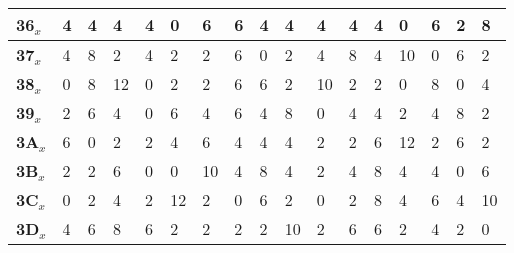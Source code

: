 \begin{longtable}[c]{|l|l|l|l|l|l|l|l|l|l|l|l|l|l|l|l|l|}
\textbf{36$_x$} & 4              & 4              & 4              & 4              & 0              & 6              & 6              & 4              & 4              & 4              & 4              & 4              & 0              & 6              & 2              & 8              \\ \hline
\textbf{37$_x$} & 4              & 8              & 2              & 4              & 2              & 2              & 6              & 0              & 2              & 4              & 8              & 4              & 10             & 0              & 6              & 2              \\ \hline
\textbf{38$_x$} & 0              & 8              & 12             & 0              & 2              & 2              & 6              & 6              & 2              & 10             & 2              & 2              & 0              & 8              & 0              & 4              \\ \hline
\textbf{39$_x$} & 2              & 6              & 4              & 0              & 6              & 4              & 6              & 4              & 8              & 0              & 4              & 4              & 2              & 4              & 8              & 2              \\ \hline
\textbf{3A$_x$} & 6              & 0              & 2              & 2              & 4              & 6              & 4              & 4              & 4              & 2              & 2              & 6              & 12             & 2              & 6              & 2              \\ \hline
\textbf{3B$_x$} & 2              & 2              & 6              & 0              & 0              & 10             & 4              & 8              & 4              & 2              & 4              & 8              & 4              & 4              & 0              & 6              \\ \hline
\textbf{3C$_x$} & 0              & 2              & 4              & 2              & 12             & 2              & 0              & 6              & 2              & 0              & 2              & 8              & 4              & 6              & 4              & 10             \\ \hline
\textbf{3D$_x$} & 4              & 6              & 8              & 6              & 2              & 2              & 2              & 2              & 10             & 2              & 6              & 6              & 2              & 4              & 2              & 0              \\ \hline

\end{longtable}
